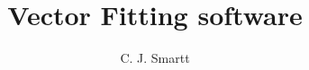 \documentclass{article}
\begin{document}
\title{Vector Fitting software}
\author{C. J. Smartt}

\maketitle




\clearpage



\clearpage



\clearpage



\clearpage
\end{document}
